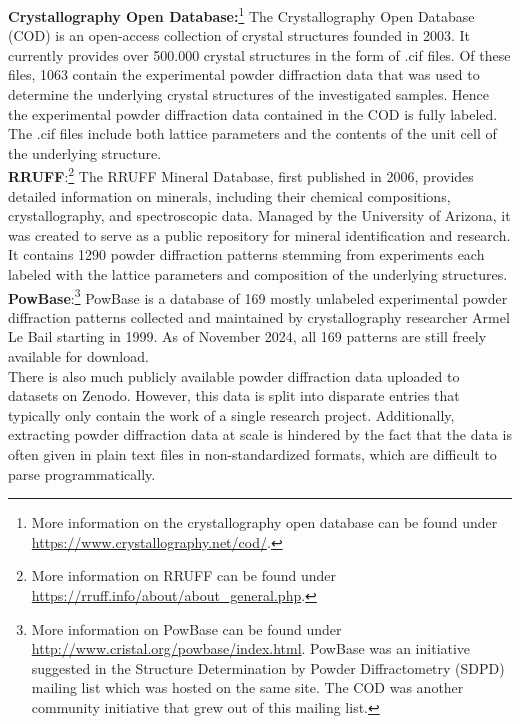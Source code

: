 \textbf{Crystallography Open Database:}\footnote{More information on the crystallography open database can be found under \url{https://www.crystallography.net/cod/}.} The Crystallography Open Database (COD) is an open-access collection of crystal structures founded in 2003\cite{Graulis2009cod}. It currently provides over 500.000 crystal structures in the form of .cif files. Of these files, 1063 contain the experimental powder diffraction data that was used to determine the underlying crystal structures of the investigated samples. Hence the experimental powder diffraction data contained in the COD is fully labeled. The .cif files include both lattice parameters and the contents of the unit cell of the underlying structure. \\

\textbf{RRUFF}:\footnote{More information on RRUFF can be found under \url{https://rruff.info/about/about_general.php}.} The RRUFF Mineral Database, first published in 2006, provides detailed information on minerals, including their chemical compositions, crystallography, and spectroscopic data. Managed by the University of Arizona, it was created to serve as a public repository for mineral identification and research. It contains \num{1290} powder diffraction patterns stemming from experiments each labeled with the lattice parameters and composition of the underlying structures. \\

\textbf{PowBase}:\footnote{More information on PowBase can be found under \url{http://www.cristal.org/powbase/index.html}. PowBase was an initiative suggested in the Structure Determination by
Powder Diffractometry (SDPD) mailing list which was hosted on the same site. The COD was another community initiative that grew out of this mailing list.} PowBase is a database of 169 mostly unlabeled experimental powder diffraction patterns collected and maintained by crystallography researcher Armel Le Bail starting in 1999. As of November 2024, all 169 patterns are still freely available for download. \\

There is also much publicly available powder diffraction data uploaded to datasets on Zenodo. However, this data is split into disparate entries that typically only contain the work of a single research project. Additionally, extracting powder diffraction data at scale is hindered by the fact that the data is often given in plain text files in non-standardized formats, which are difficult to parse programmatically. \\

